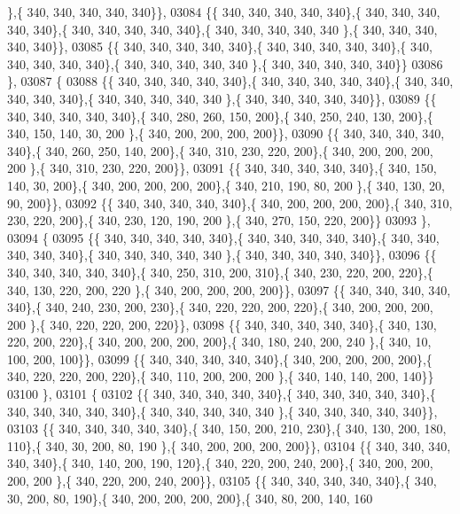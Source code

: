 \begin{DoxyCode}
      \},\{ 340, 340, 340, 340, 340\}\},
03084 \{\{ 340, 340, 340, 340, 340\},\{ 340, 340, 340, 340, 340\},\{ 340, 340, 340, 340, 340\},\{ 340, 340, 340, 340, 340
      \},\{ 340, 340, 340, 340, 340\}\},
03085 \{\{ 340, 340, 340, 340, 340\},\{ 340, 340, 340, 340, 340\},\{ 340, 340, 340, 340, 340\},\{ 340, 340, 340, 340, 340
      \},\{ 340, 340, 340, 340, 340\}\}
03086 \},
03087 \{
03088 \{\{ 340, 340, 340, 340, 340\},\{ 340, 340, 340, 340, 340\},\{ 340, 340, 340, 340, 340\},\{ 340, 340, 340, 340, 340
      \},\{ 340, 340, 340, 340, 340\}\},
03089 \{\{ 340, 340, 340, 340, 340\},\{ 340, 280, 260, 150, 200\},\{ 340, 250, 240, 130, 200\},\{ 340, 150, 140,  30, 200
      \},\{ 340, 200, 200, 200, 200\}\},
03090 \{\{ 340, 340, 340, 340, 340\},\{ 340, 260, 250, 140, 200\},\{ 340, 310, 230, 220, 200\},\{ 340, 200, 200, 200, 200
      \},\{ 340, 310, 230, 220, 200\}\},
03091 \{\{ 340, 340, 340, 340, 340\},\{ 340, 150, 140,  30, 200\},\{ 340, 200, 200, 200, 200\},\{ 340, 210, 190,  80, 200
      \},\{ 340, 130,  20,  90, 200\}\},
03092 \{\{ 340, 340, 340, 340, 340\},\{ 340, 200, 200, 200, 200\},\{ 340, 310, 230, 220, 200\},\{ 340, 230, 120, 190, 200
      \},\{ 340, 270, 150, 220, 200\}\}
03093 \},
03094 \{
03095 \{\{ 340, 340, 340, 340, 340\},\{ 340, 340, 340, 340, 340\},\{ 340, 340, 340, 340, 340\},\{ 340, 340, 340, 340, 340
      \},\{ 340, 340, 340, 340, 340\}\},
03096 \{\{ 340, 340, 340, 340, 340\},\{ 340, 250, 310, 200, 310\},\{ 340, 230, 220, 200, 220\},\{ 340, 130, 220, 200, 220
      \},\{ 340, 200, 200, 200, 200\}\},
03097 \{\{ 340, 340, 340, 340, 340\},\{ 340, 240, 230, 200, 230\},\{ 340, 220, 220, 200, 220\},\{ 340, 200, 200, 200, 200
      \},\{ 340, 220, 220, 200, 220\}\},
03098 \{\{ 340, 340, 340, 340, 340\},\{ 340, 130, 220, 200, 220\},\{ 340, 200, 200, 200, 200\},\{ 340, 180, 240, 200, 240
      \},\{ 340,  10, 100, 200, 100\}\},
03099 \{\{ 340, 340, 340, 340, 340\},\{ 340, 200, 200, 200, 200\},\{ 340, 220, 220, 200, 220\},\{ 340, 110, 200, 200, 200
      \},\{ 340, 140, 140, 200, 140\}\}
03100 \},
03101 \{
03102 \{\{ 340, 340, 340, 340, 340\},\{ 340, 340, 340, 340, 340\},\{ 340, 340, 340, 340, 340\},\{ 340, 340, 340, 340, 340
      \},\{ 340, 340, 340, 340, 340\}\},
03103 \{\{ 340, 340, 340, 340, 340\},\{ 340, 150, 200, 210, 230\},\{ 340, 130, 200, 180, 110\},\{ 340,  30, 200,  80, 190
      \},\{ 340, 200, 200, 200, 200\}\},
03104 \{\{ 340, 340, 340, 340, 340\},\{ 340, 140, 200, 190, 120\},\{ 340, 220, 200, 240, 200\},\{ 340, 200, 200, 200, 200
      \},\{ 340, 220, 200, 240, 200\}\},
03105 \{\{ 340, 340, 340, 340, 340\},\{ 340,  30, 200,  80, 190\},\{ 340, 200, 200, 200, 200\},\{ 340,  80, 200, 140, 160

\end{DoxyCode}
